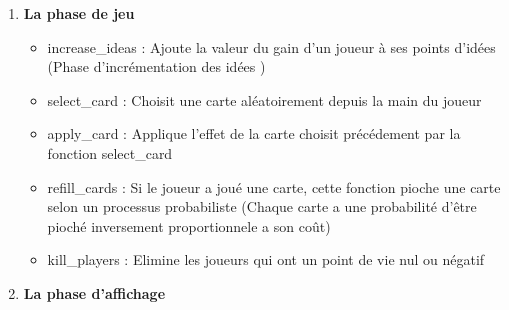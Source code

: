 \documentclass[a4paper]{article}
\begin{document}
\begin{enumerate}

\item \textbf{La phase de jeu} \\
\begin{itemize}  

\item increase\_ideas : Ajoute la valeur du gain d'un joueur à ses points d'idées (Phase d'incrémentation des idées )\\
\item select\_card : Choisit une carte aléatoirement depuis la main du joueur \\
\item apply\_card  : Applique l'effet de la carte choisit précédement par la fonction select\_card \\
\item refill\_cards  : Si le joueur a joué une carte, cette fonction pioche une carte selon un processus probabiliste (Chaque carte a une probabilité d'être pioché inversement proportionnele a son coût)\\
\item kill\_players  : Elimine les joueurs qui ont un point de vie nul ou négatif \\
\end{itemize}
\item \textbf{La phase d'affichage} \\


\end{enumerate}
\end{document}
